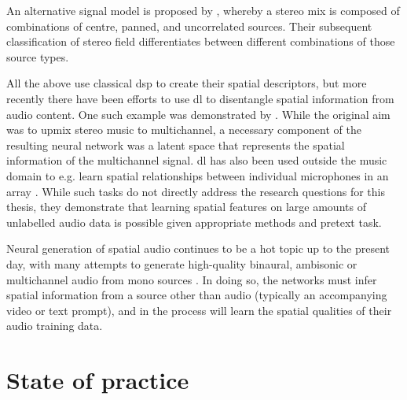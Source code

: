 \documentclass[a4paper]{article}
\newcommand{\citeauthorandnumber}[1]{\citeauthor{#1} \cite{#1}}
\begin{document}
An alternative signal model is proposed by \citeauthor{harmaClassificationTimefrequencyRegions2010} \cite{harmaClassificationTimefrequencyRegions2010,harmaClassificationTimefrequencyRegions2011,harmaStereoAudioClassification2011}, whereby a stereo mix is composed of combinations of centre, panned, and uncorrelated sources. Their subsequent classification of stereo field differentiates between different combinations of those source types.

All the above use classical \gls{dsp} to create their spatial descriptors, but more recently there have been efforts to use \gls{dl} to disentangle spatial information from audio content. One such example was demonstrated by \citeauthorandnumber{yangUpmixingStyleTransfer2022}. While the original aim was to upmix stereo music to multichannel, a necessary component of the resulting neural network was a latent space that represents the spatial information of the multichannel signal. \gls{dl} has also been used outside the music domain to e.g. learn spatial relationships between individual microphones in an array \cite{yangSelfSupervisedLearningSpatial2024}. While such tasks do not directly address the research questions for this thesis, they demonstrate that learning spatial features on large amounts of unlabelled audio data is possible given appropriate methods and pretext task.

Neural generation of spatial audio continues to be a hot topic up to the present day, with many attempts to generate high-quality binaural, ambisonic or multichannel audio from mono sources \cite{limEnhancingSpatialAudio2024,liCyclicLearningBinaural2024,liTASPersonalizedTextguided2024,chenCCStereoAudioVisualContextual2025,melechovskySonicMasterControllableAllinOne2025,santosLargeScaleSelfSupervisedLearning2025,wangSpatialV2AVisualGuidedHighfidelity2026}. In doing so, the networks must infer spatial information from a source other than audio (typically an accompanying video or text prompt), and in the process will learn the spatial qualities of their audio training data.


\section{State of practice}
\end{document}
